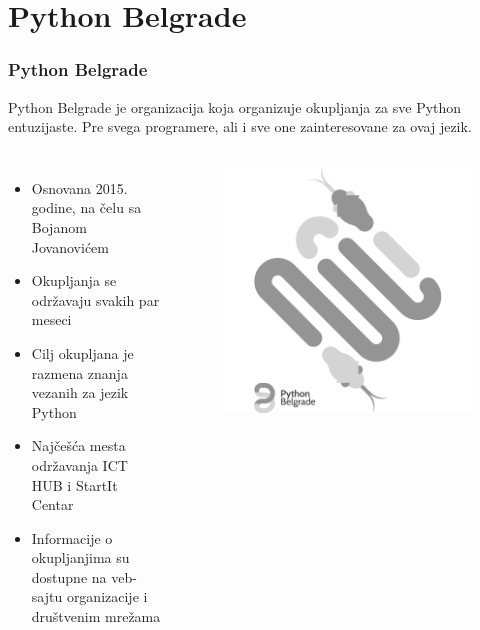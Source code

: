 \documentclass[hyperref={bookmarks=false},aspectratio=169]{beamer}
\begin{document}
\section{Python Belgrade}
\begin{frame}
\frametitle{Python Belgrade}
Python Belgrade je organizacija koja organizuje okupljanja za sve Python entuzijaste. Pre svega programere, ali i sve one zainteresovane za ovaj jezik.

\begin{columns}[T]

\begin{itemize}
    \item Osnovana 2015. godine, na čelu sa Bojanom Jovanovićem
    \item Okupljanja se održavaju svakih par meseci
    \item Cilj okupljana je razmena znanja vezanih za jezik Python
    \item Najčešća mesta održavanja ICT HUB i StartIt Centar
    \item Informacije o okupljanjima su dostupne na veb-sajtu organizacije i društvenim mrežama
\end{itemize}

\begin{figure}
    \raggedleft
    \includegraphics[scale=0.075]{./images/pybgd.png}
\end{figure}

\end{columns}

\end{frame}
\end{document}
